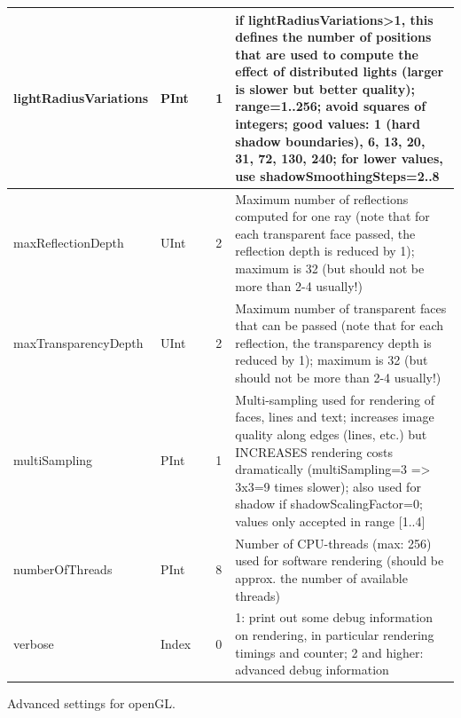 \begin{center}
\begin{longtable}{| p{4.2cm} | p{2.5cm} | p{0.3cm} | p{3.0cm} | p{6cm} |}
    lightRadiusVariations &     PInt &      &     1 &     if lightRadiusVariations>1, this defines the number of positions that are used to compute the effect of distributed lights (larger is slower but better quality); range=1..256; avoid squares of integers; good values: 1 (hard shadow boundaries), 6, 13, 20, 31, 72, 130, 240; for lower values, use shadowSmoothingSteps=2..8\\ \hline
    maxReflectionDepth &     UInt &      &     2 &     Maximum number of reflections computed for one ray (note that for each transparent face passed, the reflection depth is reduced by 1); maximum is 32 (but should not be more than 2-4 usually!)\\ \hline
    maxTransparencyDepth &     UInt &      &     2 &     Maximum number of transparent faces that can be passed (note that for each reflection, the transparency depth is reduced by 1); maximum is 32 (but should not be more than 2-4 usually!)\\ \hline
    multiSampling &     PInt &      &     1 &     Multi-sampling used for rendering of faces, lines and text; increases image quality along edges (lines, etc.) but INCREASES rendering costs dramatically (multiSampling=3 => 3x3=9 times slower); also used for shadow if shadowScalingFactor=0; values only accepted in range [1..4]\\ \hline
    numberOfThreads &     PInt &      &     8 &     Number of CPU-threads (max: 256) used for software rendering (should be approx. the number of available threads)\\ \hline
    verbose &     Index &      &     0 &     1: print out some debug information on rendering, in particular rendering timings and counter; 2 and higher: advanced debug information\\ \hline
	  \end{longtable}
	\end{center}



\label{sec:VSettingsOpenGLAdvanced}
Advanced settings for openGL.

